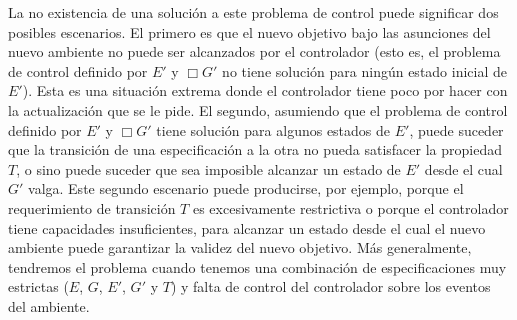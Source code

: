 La no existencia de una solución a este problema de control puede significar dos posibles escenarios. El primero es que
el nuevo objetivo bajo las asunciones del nuevo ambiente no puede ser alcanzados por el controlador (esto es, el
problema de control definido por $E'$ y $\Box G'$ no tiene solución para ningún estado inicial de $E'$). Esta es una
situación extrema donde el controlador tiene poco por hacer con la actualización que se le pide. El segundo, asumiendo
que el problema de control definido por $E'$ y $\Box G'$ tiene solución para algunos estados de $E'$, puede suceder que la
transición de una especificación a la otra no pueda satisfacer la propiedad $T$, o sino puede suceder que sea
imposible alcanzar un estado de $E'$ desde el cual $G'$ valga. Este segundo escenario puede producirse, por ejemplo,
porque el requerimiento de transición $T$ es excesivamente restrictiva o porque el controlador tiene capacidades
insuficientes, para alcanzar un estado desde el cual el nuevo ambiente puede garantizar la validez del nuevo
objetivo. Más generalmente, tendremos el problema cuando tenemos una combinación de especificaciones muy estrictas ($E$,
$G$, $E'$, $G'$ y $T$) y falta de control del controlador sobre los eventos del ambiente.
